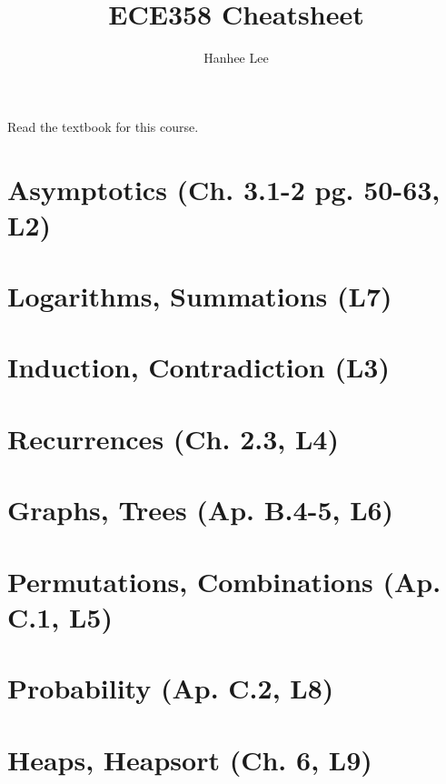 \documentclass{article}
\title{ECE358 Cheatsheet}
\author{Hanhee Lee}
\begin{document}
\maketitle

\tableofcontents

\listoffigures

\listoftables

Read the textbook for this course.

\section{Asymptotics (Ch. 3.1-2 pg. 50-63, L2)} %


\section{Logarithms, Summations (L7)} %


\section{Induction, Contradiction (L3)} %


\section{Recurrences (Ch. 2.3, L4)} %


\section{Graphs, Trees (Ap. B.4-5, L6)} %


\section{Permutations, Combinations (Ap. C.1, L5)} %


\section{Probability (Ap. C.2, L8)} %


\section{Heaps, Heapsort (Ch. 6, L9)} %

\end{document}
